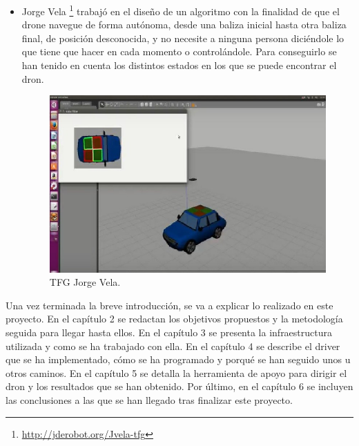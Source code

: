 \begin{itemize}
\item Jorge Vela \footnote{\url{http://jderobot.org/Jvela-tfg}} trabajó en el diseño de un algoritmo con la finalidad de que el drone navegue de forma aut\'onoma, desde una baliza inicial hasta otra baliza final, de posici\'on desconocida, y no necesite a ninguna persona dici\'endole lo que tiene que hacer en cada momento o control\'andole. Para conseguirlo se han tenido en cuenta los distintos estados en los que se puede encontrar el dron.

\begin{figure}[H]
  \centering
  \includegraphics[scale=0.7]{imagenes/Jorge-Vela.jpg}
  \caption{TFG Jorge Vela.}
  \label{fig:jorgeVela}
\end{figure}

\end{itemize}

Una vez terminada la breve introducción, se va a explicar lo realizado en
este proyecto. En el capítulo 2 se redactan los objetivos propuestos y la metodología
seguida para llegar hasta ellos. En el capítulo 3 se presenta la infraestructura utilizada
y como se ha trabajado con ella. En el capítulo 4 se describe el driver que se ha implementado,
cómo se ha programado y porqué se han seguido unos u otros caminos. En el capítulo
5 se detalla la herramienta de apoyo para dirigir el dron y los resultados que se han obtenido.
Por último, en el capítulo 6 se incluyen las conclusiones a las que se han llegado tras
finalizar este proyecto.